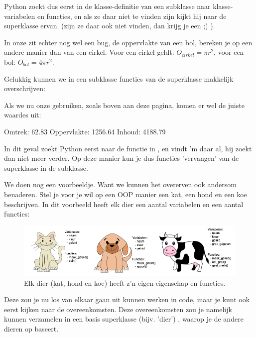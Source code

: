 Python zoekt dus eerst in de klasse-definitie van een subklasse naar klasse-variabelen en functies, en als ze daar niet te vinden zijn kijkt hij naar de superklasse ervan. (zijn ze daar ook niet vinden, dan krijg je een  ;) ). 

In onze  zit echter nog wel een bug, de oppervlakte van een bol, bereken je op een andere manier dan van een cirkel. Voor een cirkel geldt: $O_{cirkel} = \pi r^2$, voor een bol: $O_{bol} = 4\pi r^2$. 

Gelukkig kunnen we in een subklasse functies van de superklasse makkelijk overschrijven:

Als we nu onze  gebruiken, zoals boven aan deze pagina, komen er wel de juiste waardes uit:
\begin{python}
Omtrek: 62.83
Oppervlakte: 1256.64
Inhoud: 4188.79
\end{python}

In dit geval zoekt Python eerst naar de functie  in , en vindt 'm daar al, hij zoekt dan niet meer verder. Op deze manier kun je dus functies 'vervangen' van de superklasse in de subklasse.  

We doen nog een voorbeeldje. Want we kunnen het overerven ook andersom benaderen. Stel je voor je wil op een OOP manier een kat, een hond en een koe beschrijven. In dit voorbeeld heeft elk dier een aantal variabelen en een aantal functies: 

\begin{figure}[h!]
\centering\includegraphics[scale=0.5]{Pictures/chapter08/animals.png}
  \caption{\small Elk dier (kat, hond en koe) heeft z'n eigen eigenschap en functies.} 
\label{fig:animals} %
\end{figure}

Deze zou je nu los van elkaar gaan uit kunnen werken in code, maar je kunt ook eerst kijken naar de overeenkomsten. Deze overeenkomsten zou je namelijk kunnen verzamelen in een basis superklasse (bijv. 'dier') , waarop je de andere dieren op baseert. 


